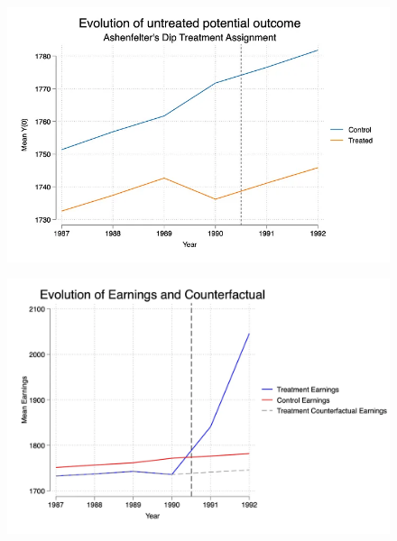 \documentclass{beamer}
\begin{document}
\begin{frame}
 
\begin{figure}
    \centering
    \includegraphics[width=\textwidth]{./lecture_includes/ashenfelter_po}
\end{figure}

\end{frame}

\begin{frame}
 
\begin{figure}
    \centering
    \includegraphics[width=\textwidth]{./lecture_includes/ashenfelter_y0b}
\end{figure}

\end{frame}
\end{document}
